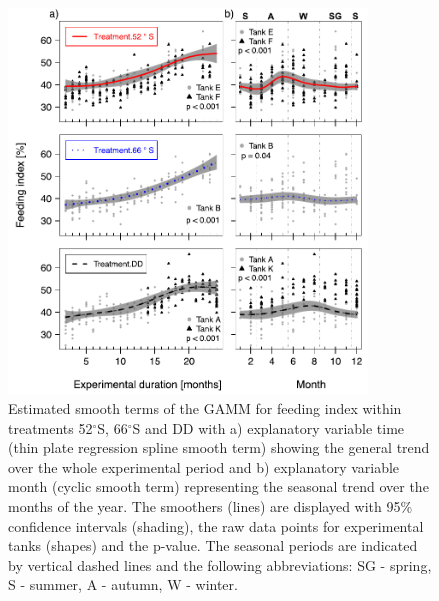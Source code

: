 \begin{figure}[htb!]
        \centering
        \includegraphics[width=0.85\textwidth]{../Figures/Pub2_4.pdf}
        \caption{Estimated smooth terms of the GAMM for feeding index within
        treatments 52$^{\circ}$S, 66$^{\circ}$S and DD with a) explanatory
        variable time (thin plate regression spline smooth term) showing the
        general trend over the whole experimental period and b) explanatory
        variable month (cyclic smooth term) representing the seasonal trend
        over the months of the year. The smoothers (lines) are displayed with
        95\% confidence intervals (shading), the raw data points for
        experimental tanks (shapes) and the p-value. The seasonal periods are
        indicated by vertical dashed lines and the following abbreviations: SG
        - spring, S - summer, A - autumn, W - winter.}
        \label{Pub2_4}
\end{figure}

